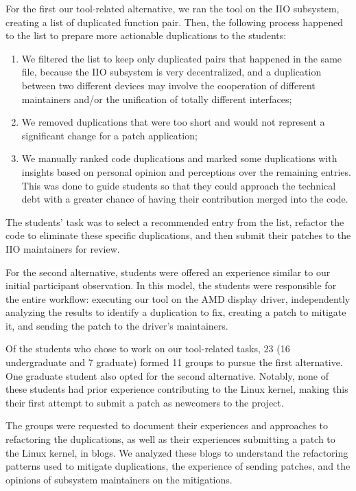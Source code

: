\documentclass[10pt,conference]{IEEEtran}
\begin{document}
For the first our tool-related alternative, we ran the tool on the IIO subsystem, creating a list of duplicated function pair. Then, the following process happened to the list to prepare more actionable duplications to the students:

\begin{enumerate}
    \item We filtered the list to keep only duplicated pairs that happened in the same file, because the IIO subsystem is very decentralized, and a duplication between two different devices may involve the cooperation of different maintainers and/or the unification of totally different interfaces;
    \item We removed duplications that were too short and would not represent a significant change for a patch application;
    \item We manually ranked code duplications and marked some duplications with insights based on personal opinion and perceptions over the remaining entries. This was done to guide students so that they could approach the technical debt with a greater chance of having their contribution merged into the code.
\end{enumerate}

The students' task was to select a recommended entry from the list, refactor the code to eliminate these specific duplications, and then submit their patches to the IIO maintainers for review.

For the second alternative, students were offered an experience similar to our initial participant 
observation. In this model, the students were responsible for the entire workflow: executing our tool on the AMD display driver, independently analyzing the results to identify a duplication 
to fix, creating a patch to mitigate it, and sending the patch to the driver's maintainers.

Of the students who chose to work on our tool-related tasks, 23 (16 undergraduate and 7 graduate) 
formed 11 groups to pursue the first alternative. One graduate student also opted for the second alternative. Notably, none of these students had prior experience contributing to the Linux kernel, making this their first attempt to submit a patch as newcomers to the project.

The groups were requested to document their experiences and approaches to refactoring the duplications, as well as their experiences submitting a patch to the Linux kernel, in blogs. We analyzed these blogs to understand the refactoring patterns used to mitigate duplications, the experience of sending patches, and the opinions of subsystem maintainers on the mitigations.
\end{document}
